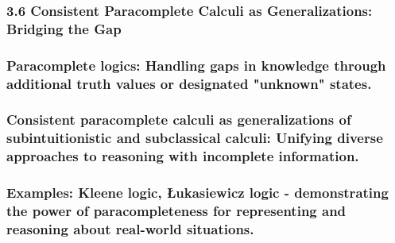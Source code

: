 \hypertarget{consistent-paracomplete-calculi-as-generalizations-bridging-the-gap}{%
\subsubsection*{\texorpdfstring{\textbf{3.6 Consistent Paracomplete
Calculi as Generalizations: Bridging the
Gap}}{3.6 Consistent Paracomplete Calculi as Generalizations: Bridging the Gap}}\label{consistent-paracomplete-calculi-as-generalizations-bridging-the-gap}}

\hypertarget{paracomplete-logics-handling-gaps-in-knowledge-through-additional-truth-values-or-designated-unknown-states.}{%
\subsubsection{Paracomplete logics: Handling gaps in knowledge through
additional truth values or designated "unknown"
states.}\label{paracomplete-logics-handling-gaps-in-knowledge-through-additional-truth-values-or-designated-unknown-states.}}

\hypertarget{consistent-paracomplete-calculi-as-generalizations-of-subintuitionistic-and-subclassical-calculi-unifying-diverse-approaches-to-reasoning-with-incomplete-information.}{%
\subsubsection{Consistent paracomplete calculi as generalizations of
subintuitionistic and subclassical calculi: Unifying diverse approaches
to reasoning with incomplete
information.}\label{consistent-paracomplete-calculi-as-generalizations-of-subintuitionistic-and-subclassical-calculi-unifying-diverse-approaches-to-reasoning-with-incomplete-information.}}

\hypertarget{examples-kleene-logic-ux142ukasiewicz-logic---demonstrating-the-power-of-paracompleteness-for-representing-and-reasoning-about-real-world-situations.}{%
\subsubsection{Examples: Kleene logic, Łukasiewicz logic - demonstrating
the power of paracompleteness for representing and reasoning about
real-world
situations.}\label{examples-kleene-logic-ux142ukasiewicz-logic---demonstrating-the-power-of-paracompleteness-for-representing-and-reasoning-about-real-world-situations.}}

